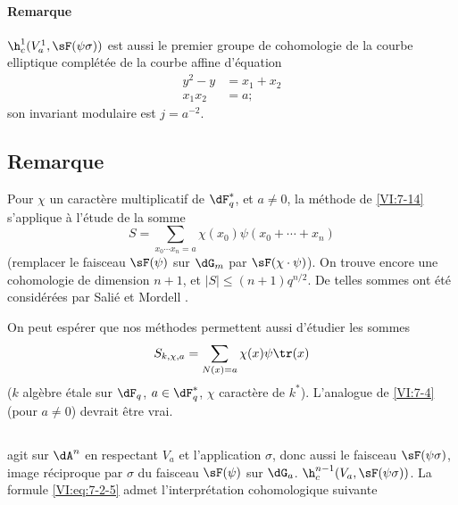 \paragraph{Remarque}

$\h_c^1(V_a^1,\sF(\psi\sigma))$ est aussi le premier groupe de cohomologie de 
la courbe elliptique complétée de la courbe affine d'équation 
\begin{align*}
  y^2-y &= x_1+x_2 \\
  x_1 x_2 &= a \text{;} 
\end{align*}
son invariant modulaire est $j=a^{-2}$. 





\subsection{Remarque}\label{VI:7-18}

Pour $\chi$ un caractère multiplicatif de $\dF_q^\ast$, et $a\ne 0$, la 
méthode de \ref{VI:7-14} s'applique à l'étude de la somme 
\[
  S = \sum_{x_0\dotsm x_n = a} \chi(x_0) \psi(x_0+\cdots + x_n) 
\]
(remplacer le faisceau $\sF(\psi)$ sur $\dG_m$ par $\sF(\chi\cdot \psi)$). On 
trouve encore une cohomologie de dimension $n+1$, et 
$|S|\leqslant (n+1)q^{n/2}$. De telles sommes ont été considérées par 
Salié et Mordell .

On peut espérer que nos méthodes permettent aussi d'étudier les sommes 
\[
  S_{k,\chi,a} = \sum_{N(x)=a} \chi(x) \psi \tr(x) 
\]
($k$ algèbre étale sur $\dF_q$, $a\in \dF_q^\ast$, $\chi$ caractère de 
$k^\ast$). L'analogue de \ref{VI:7-4} (pour $a\ne 0$) devrait être vrai. 





\subsection{}\label{VI:7-19}

 agit sur $\dA^n$ en respectant $V_a$ et 
l'application $\sigma$, donc aussi le faisceau $\sF(\psi\sigma)$, image 
réciproque par $\sigma$ du faisceau $\sF(\psi)$ sur $\dG_a$.  $\h_c^{n-1}(V_a,\sF(\psi\sigma))$. La formule \eqref{VI:eq:7-2-5} admet 
l'interprétation cohomologique suivante





